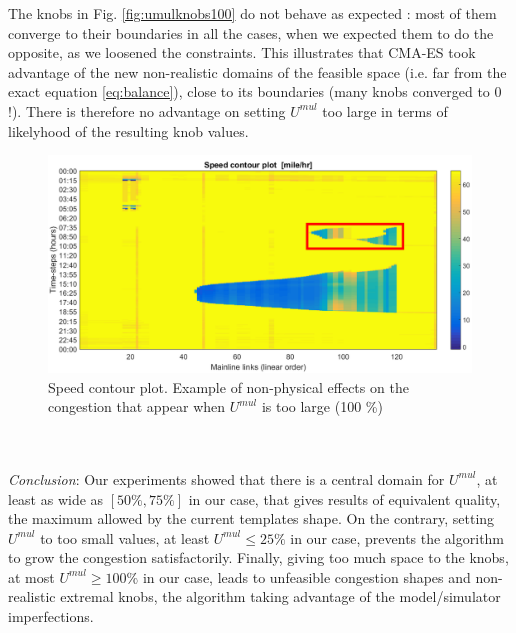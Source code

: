The knobs in Fig. \ref{fig:umulknobs100} do not behave as expected : most of them converge to their boundaries in all the cases, when we expected them to do the opposite, as we loosened the constraints. This illustrates that CMA-ES took advantage of the new non-realistic domains of the feasible space (i.e. far from the exact equation \ref{eq:balance}), close to its boundaries (many knobs converged to 0 !). There is therefore no advantage on setting $U^{mul}$ too large in terms of likelyhood of the resulting knob values.
\begin{figure}[!h]
	\caption{Speed contour plot. Example of non-physical effects on the congestion that appear when $U^{mul}$ is too large (100 \%)}
	\label{fig:badcontourplot}
	\includegraphics[width=7in]{figures/results_figures/Umul/badcontourplot.png}
\end{figure}
\\
\\
\emph{Conclusion}: Our experiments showed that there is a central domain for $U^{mul}$, at least as wide as $[50\% , 75\% ]$ in our case, that gives results of equivalent quality, the maximum allowed by the current templates shape. On the contrary, setting $U^{mul}$ to too small values, at least $U^{mul}\leq 25\% $ in our case, prevents the algorithm to grow the congestion satisfactorily. Finally, giving too much space to the knobs, at most $U^{mul}\geq 100\%$ in our case, leads to unfeasible congestion shapes and non-realistic extremal knobs, the algorithm taking advantage of the model/simulator imperfections. 